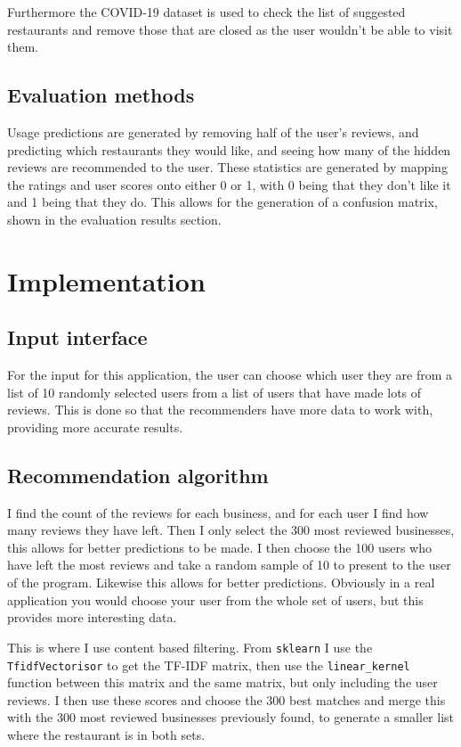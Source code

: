 \documentclass[conference]{IEEEtran}
\begin{document}
Furthermore the COVID-19 dataset is used to check the list of suggested restaurants and remove those that are closed as the user wouldn't be able to visit them.

\subsection{Evaluation methods}

Usage predictions are generated by removing half of the user's reviews, and predicting which restaurants they would like, and seeing how many of the hidden reviews are recommended to the user. These statistics are generated by mapping the ratings and user scores onto either 0 or 1, with 0 being that they don't like it and 1 being that they do. This allows for the generation of a confusion matrix, shown in the evaluation results section.


\section{Implementation}

\subsection{Input interface}

For the input for this application, the user can choose which user they are from a list of 10 randomly selected users from a list of users that have made lots of reviews. This is done so that the recommenders have more data to work with, providing more accurate results.

\subsection{Recommendation algorithm}

I find the count of the reviews for each business, and for each user I find how many reviews they have left. Then I only select the 300 most reviewed businesses, this allows for better predictions to be made. I then choose the 100 users who have left the most reviews and take a random sample of 10 to present to the user of the program. Likewise this allows for better predictions. Obviously in a real application you would choose your user from the whole set of users, but this provides more interesting data.

This is where I use content based filtering. From \texttt{sklearn} I use the \texttt{TfidfVectorisor} to get the TF-IDF matrix, then use the \texttt{linear\_kernel} function between this matrix and the same matrix, but only including the user reviews. I then use these scores and choose the 300 best matches and merge this with the 300 most reviewed businesses previously found, to generate a smaller list where the restaurant is in both sets.
\end{document}
